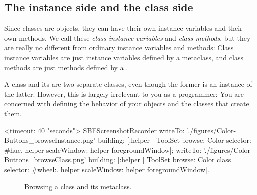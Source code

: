 \documentclass[a4paper,10pt,twoside]{book}
\begin{document}
\subsection{The instance side and the class side}

Since classes are objects, they can have their own instance variables and their own methods.
We call these \emph{class instance variables} and \emph{class methods}, but they are really no different from ordinary instance variables and methods:
Class instance variables are just instance variables defined by a metaclass, and class methods are just methods defined by a .

A class and its  are two separate classes, even though the former is an instance of the latter.
However, this is largely irrelevant to you as a programmer:
You are concerned with defining the behavior of your objects and the classes that create them.

\begin{ExecuteSmalltalkScript}
<timeout: 40 "seconds">
SBEScreenshotRecorder
	writeTo: './figures/Color-Buttons_browseInstance.png' building: [:helper |
		ToolSet browse: Color selector: #hue.
		helper scaleWindow: helper foregroundWindow];
	writeTo: './figures/Color-Buttons_browseClass.png' building: [:helper |
		ToolSet browse: Color class selector: #wheel:.
		helper scaleWindow: helper foregroundWindow].
\end{ExecuteSmalltalkScript}
\begin{figure}[htb]
\begin{center}
	\begin{scaletikzpicturetowidth}{\textwidth}
	\end{scaletikzpicturetowidth}
\caption{Browsing a class and its metaclass.
\label{fig:Buttons}}
\end{center}
\end{figure}
\end{document}
